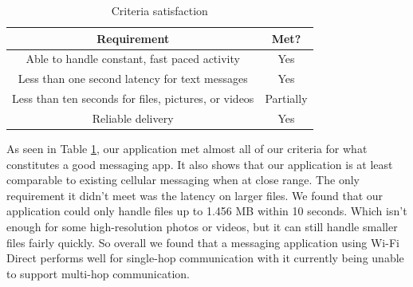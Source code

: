 \documentclass[10pt]{article}
\begin{document}
\begin{table}
    \centering
    \begin{tabular}{|c|c|}
        \hline
        Requirement & Met?\\
        \hline \hline
        Able to handle constant, fast paced activity & Yes\\
        \hline
        Less than one second latency for text messages & Yes\\
        \hline
        Less than ten seconds for files, pictures, or videos & Partially\\
        \hline
        Reliable delivery & Yes\\
        \hline
    \end{tabular}
    \caption{Criteria satisfaction}
    \label{tab:conclusions}
\end{table}

As seen in Table \ref{tab:conclusions}, our application met almost all of our criteria for what constitutes a good messaging app. It also shows that our application is at least comparable to existing cellular messaging when at close range. The only requirement it didn't meet was the latency on larger files. We found that our application could only handle files up to 1.456 MB within 10 seconds. Which isn't enough for some high-resolution photos or videos, but it can still handle smaller files fairly quickly. So overall we found that a messaging application using Wi-Fi Direct performs well for single-hop communication with it currently being unable to support multi-hop communication.

\renewcommand{\refname} {\section{References}}

{}
\end{document}
